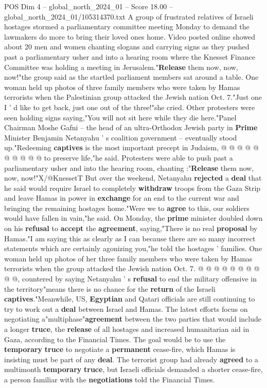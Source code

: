 \begin{textsample}{POS Dim 4 – global\_north\_2024\_01 – Score 18.00 – global\_north\_2024\_01/105314370.txt}  \label{ex:f4_pos_338}
A group of frustrated relatives of Israeli hostages stormed a parliamentary committee meeting Monday to demand the lawmakers do more to bring their loved ones home.
Video posted online showed about 20 men and women chanting slogans and carrying signs as they pushed past a parliamentary usher and into a hearing room where the Knesset Finance Committee was holding a meeting in Jerusalem."\textbf{Release} them now, now, now!"the group said as the startled parliament members sat around a table.
One woman held up photos of three family members who were taken by Hamas terrorists when the Palestinian group attacked the Jewish nation Oct. 7."Just one I ' d like to get back, just one out of the three!"she cried.
Other protesters were seen holding signs saying,"You will not sit here while they die here."Panel Chairman Moshe Gafni -- the head of an ultra-Orthodox Jewish party in \textbf{Prime} Minister Benjamin Netanyahu ' s coalition government -- eventually stood up."Redeeming \textbf{captives} is the most important precept in Judaism, @ @ @ @ @ @ @ @ @ @ to preserve life,"he said.
Protesters were able to push past a parliamentary usher and into the hearing room, chanting :"\textbf{Release} them now, now, now!"X/@KnessetT But over the weekend, Netanyahu \textbf{rejected} a \textbf{deal} that he said would require Israel to completely \textbf{withdraw} troops from the Gaza Strip and leave Hamas in power in \textbf{exchange} for an end to the current war and bringing the remaining hostages home."Were we to \textbf{agree} to this, our soldiers would have fallen in vain,"he said.
On Monday, the \textbf{prime} minister doubled down on his \textbf{refusal} to \textbf{accept} the \textbf{agreement}, saying,"There is no real \textbf{proposal} by Hamas."I am saying this as clearly as I can because there are so many incorrect statements which are certainly agonizing you,"he told the hostages ' families.
One woman held up photos of her three family members who were taken by Hamas terrorists when the group attacked the Jewish nation Oct. 7. @ @ @ @ @ @ @ @ @ @, countered by saying Netanyahu ' s \textbf{refusal} to end the military offensive in the territory"means there is no chance for the \textbf{return} of the Israeli \textbf{captives}."Meanwhile, US, \textbf{Egyptian} and Qatari officials are still continuing to try to work out a \textbf{deal} between Israel and Hamas.
The latest efforts focus on negotiating a"multiphase"\textbf{agreement} between the two parties that would include a longer \textbf{truce}, the \textbf{release} of all hostages and increased humanitarian aid in Gaza, according to the Financial Times.
The goal would be to use the \textbf{temporary} \textbf{truce} to negotiate a \textbf{permanent} cease-fire, which Hamas is insisting must be part of any \textbf{deal}.
The terrorist group had already \textbf{agreed} to a multimonth \textbf{temporary} \textbf{truce}, but Israeli officials demanded a shorter cease-fire, a person familiar with the \textbf{negotiations} told the Financial Times.


\end{textsample}
